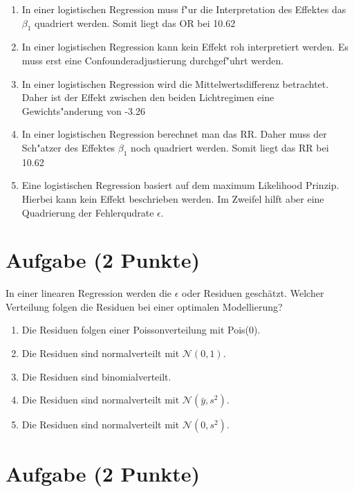 \documentclass[a4paper, 10pt]{scrartcl}\usepackage[]{graphicx}\usepackage[]{xcolor}
\begin{document}
\begin{enumerate}
\item [\textbf{A} \msquare] In einer logistischen Regression muss f{"u}r die Interpretation des Effektes das $\beta_1$ quadriert werden. Somit liegt das OR bei 10.62
\item [\textbf{B} \msquare] In einer logistischen Regression kann kein Effekt roh interpretiert werden. Es muss erst eine Confounderadjustierung durchgef{"u}hrt werden.
\item [\textbf{C} \msquare] In einer logistischen Regression wird die Mittelwertsdifferenz betrachtet. Daher ist der Effekt zwischen den beiden Lichtregimen eine Gewichts{"a}nderung von -3.26
\item [\textbf{D} \msquare] In einer logistischen Regression berechnet man das RR. Daher muss der Sch{"a}tzer des Effektes $\beta_1$ noch quadriert werden. Somit liegt das RR bei 10.62
\item [\textbf{E} \msquare] Eine logistischen Regression basiert auf dem maximum Likelihood Prinzip. Hierbei kann kein Effekt beschrieben werden. Im Zweifel hilft aber eine Quadrierung der Fehlerqudrate $\epsilon$.
\end{enumerate}

\section{Aufgabe \hfill (2 Punkte)}

In einer linearen Regression werden die $\epsilon$ oder Residuen
gesch{\"a}tzt. Welcher Verteilung folgen die Residuen bei einer optimalen
Modellierung? 



\begin{enumerate}
\item [\textbf{A} \msquare] Die Residuen folgen einer Poissonverteilung mit Pois(0).
\item [\textbf{B} \msquare] Die Residuen sind normalverteilt mit $\mathcal{N}(0, 1)$.
\item [\textbf{C} \msquare] Die Residuen sind binomialverteilt.
\item [\textbf{D} \msquare] Die Residuen sind normalverteilt mit $\mathcal{N}(\bar{y}, s^2)$.
\item [\textbf{E} \msquare] Die Residuen sind normalverteilt mit $\mathcal{N}(0, s^2)$.
\end{enumerate}

\section{Aufgabe \hfill (2 Punkte)}
\end{document}
